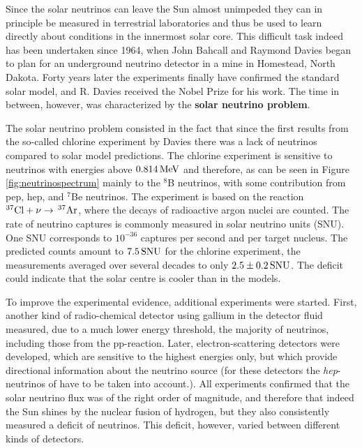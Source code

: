 \documentclass[a4paper,10pt]{article}
\begin{document}
{\noindent}Since the solar neutrinos can leave the Sun almost unimpeded they can in principle be measured in terrestrial laboratories and thus be used to learn directly about conditions in the innermost solar core. This difficult task indeed has been undertaken since 1964, when John Bahcall and Raymond Davies began to plan for an underground neutrino detector in a mine in Homestead, North Dakota. Forty years later the experiments finally have confirmed the standard solar model, and R. Davies received the Nobel Prize for his work. The time in between, however, was characterized by the \textbf{solar neutrino problem}.

{\noindent}The solar neutrino problem consisted in the fact that since the first results from the so-called chlorine experiment by Davies there was a lack of neutrinos compared to solar model predictions. The chlorine experiment is sensitive to neutrinos with energies above $0.814\,{\rm MeV}$ and therefore, as can be seen in Figure \ref{fig:neutrinospectrum} mainly to the $^8$B neutrinos, with some contribution from pep, hep, and $^7$Be neutrinos. The experiment is based on the reaction $^{37}{\rm Cl}+\nu\rightarrow\,^{37}{\rm Ar}$, where the decays of radioactive argon nuclei are counted. The rate of neutrino captures is commonly measured in solar neutrino units (SNU). One SNU corresponds to $10^{-36}$ captures per second and per target nucleus. The predicted counts amount to $7.5\,{\rm SNU}$ for the chlorine experiment, the measurements averaged over several decades to only $2.5\pm0.2\,{\rm SNU}$. The deficit could indicate that the solar centre is cooler than in the models.

{\noindent}To improve the experimental evidence, additional experiments were started. First, another kind of radio-chemical detector using gallium in the detector fluid measured, due to a much lower energy threshold, the majority of neutrinos, including those from the pp-reaction. Later, electron-scattering detectors were developed, which are sensitive to the highest energies only, but which provide directional information about the neutrino source (for these detectors the \textit{hep}-neutrinos of have to be taken into account.). All experiments confirmed that the solar neutrino flux was of the right order of magnitude, and therefore that indeed the Sun shines by the nuclear fusion of hydrogen, but they also consistently measured a deficit of neutrinos. This deficit, however, varied between different kinds of detectors.
\end{document}
